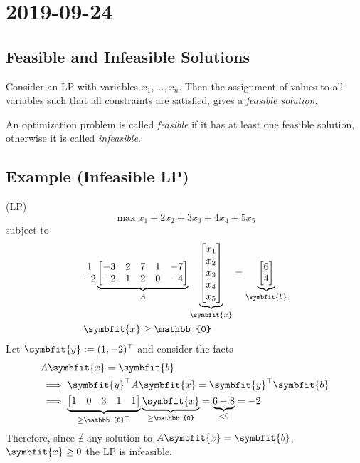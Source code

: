 \section{2019-09-24}
\begin{defbox}
    \subsection{Feasible and Infeasible Solutions}
    Consider an LP with variables $x_1,\dots,x_n$.  Then the
    assignment of values to all variables such that all constraints are satisfied,
    gives a \emph{feasible solution}.

    An optimization problem is called \emph{feasible} if it has at least one feasible
    solution, otherwise it is called \emph{infeasible}.
\end{defbox}

\subsection{Example (Infeasible LP)}
(LP)
\[\max x_1+2x_2+3x_3+4x_4+5x_5\]
subject to
\begin{align*}
    &
    \begin{matrix}
    1\\
    -2
    \end{matrix}
    \underbrace{
        \begin{bmatrix}
        -3 & 2 & 7 & 1 & -7 \\
        -2 & 1 & 2 & 0 & -4
        \end{bmatrix}}_{A}
    \underbrace{\begin{bmatrix}
        x_1\\
        x_2\\
        x_3\\
        x_4\\
        x_5
    \end{bmatrix}}_{\symbfit{x}}
    =
    \underbrace{\begin{bmatrix}
        6\\
        4
    \end{bmatrix}}_{\symbfit{b}}\\
    &\symbfit{x}\ge \mathbb{0}
\end{align*}
Let $\symbfit{y}:=(1,-2)^\top$
and consider the facts
\begin{align*}
    &A\symbfit{x}=\symbfit{b}\\
    &\implies \symbfit{y}^\top A\symbfit{x}=\symbfit{y}^\top \symbfit{b}\\
    &\implies \underbrace{\begin{bmatrix}
        1 & 0 & 3 & 1 & 1
    \end{bmatrix}}_{\ge \mathbb{0}^\top }
    \underbrace{\symbfit{x}}_{\ge \mathbb{0}}=\underbrace{6-8}_{< 0}=-2
\end{align*}
Therefore, since $\nexists$ any solution to $A\symbfit{x}=\symbfit{b}$, $\symbfit{x}\ge 0$
the LP is infeasible.


